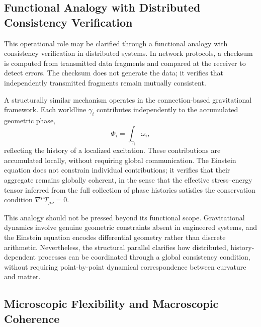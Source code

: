 \documentclass[%
 reprint,
 amsmath,amssymb,
 aps,
 prb,
]{revtex4-2}
\numberwithin{equation}{section}
\begin{document}
\subsection{Functional Analogy with Distributed Consistency Verification}
\label{subsec:checksum_analogy}

This operational role may be clarified through a functional analogy with consistency verification in distributed systems. In network protocols, a checksum is computed from transmitted data fragments and compared at the receiver to detect errors. The checksum does not generate the data; it verifies that independently transmitted fragments remain mutually consistent.

A structurally similar mechanism operates in the connection-based gravitational framework. Each worldline $\gamma_i$ contributes independently to the accumulated geometric phase,
\begin{equation}
\Phi_i = \int_{\gamma_i} \omega_i,
\end{equation}
reflecting the history of a localized excitation. These contributions are accumulated locally, without requiring global communication. The Einstein equation does not constrain individual contributions; it verifies that their aggregate remains globally coherent, in the sense that the effective stress--energy tensor inferred from the full collection of phase histories satisfies the conservation condition $\nabla^\mu T_{\mu\nu} = 0$.

This analogy should not be pressed beyond its functional scope. Gravitational dynamics involve genuine geometric constraints absent in engineered systems, and the Einstein equation encodes differential geometry rather than discrete arithmetic. Nevertheless, the structural parallel clarifies how distributed, history-dependent processes can be coordinated through a global consistency condition, without requiring point-by-point dynamical correspondence between curvature and matter.

\subsection{Microscopic Flexibility and Macroscopic Coherence}
\label{subsec:micro_macro}
\end{document}
